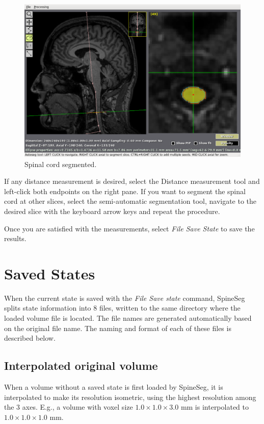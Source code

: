 \documentclass[12pt]{report}
\begin{document}
\begin{figure}[!htb]
\begin{center}
\includegraphics[width=12cm]{ex3.eps}
\caption{Spinal cord segmented.}
\label{f.ex3}
\end{center}
\end{figure}

If any distance measurement is desired, select the Distance measurement tool and left-click
both endpoints on the right pane. If you want to segment the spinal cord at other slices,
select the semi-automatic segmentation tool, navigate to the desired slice with the keyboard
arrow keys and repeat the procedure.

Once you are satisfied with the measurements, select \emph{File \btr Save State} to save
the results.

\chapter{Saved States}
\label{c.savestate}

When the current state is saved with the \emph{File \btr Save state}
command, SpineSeg splits state information into 8 files, written to
the same directory where the loaded volume file is located. The file
names are generated automatically based on the original file name. The
naming and format of each of these files is described below.

\section{Interpolated original volume}

When a volume without a saved state is first loaded by SpineSeg, it is
interpolated to make its resolution isometric, using the highest
resolution among the 3 axes.  E.g., a volume with voxel size $1.0
\times 1.0 \times 3.0$ mm is interpolated to $1.0 \times 1.0 \times
1.0$ mm.
\end{document}
